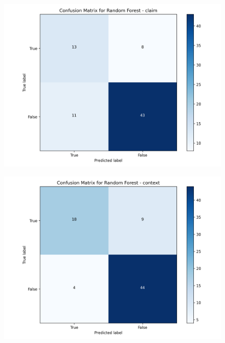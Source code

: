 \begin{figure}[h]
    \centering
    \begin{minipage}[b]{0.45\textwidth}
        \centering
        \includegraphics[width=\textwidth]{images/confusion_3.json-Random Forest_claim_confusion_matrix}
        \label{fig:confusion_3_1}
    \end{minipage}
    \hspace{1em}
    \begin{minipage}[b]{0.45\textwidth}
        \centering
        \includegraphics[width=\textwidth]{images/confusion_3.json-Random Forest_context_confusion_matrix}
        \label{fig:confusion_3_2}
    \end{minipage}
    \hspace{1em}

\end{figure}
